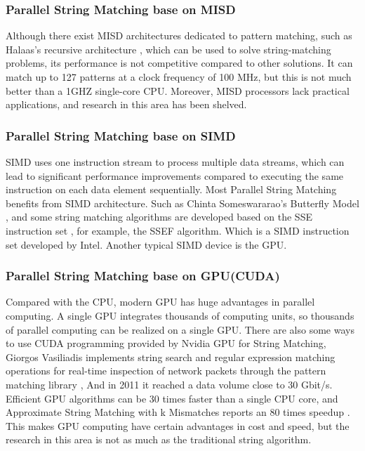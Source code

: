 \documentclass[11pt]{article}       %
\begin{document}
\subsubsection{Parallel String Matching base on MISD}
Although there exist MISD architectures dedicated to pattern matching, such as Halaas's recursive architecture \cite{MISD}, which can be used to solve string-matching problems, its performance is not competitive compared to other solutions. It can match up to 127 patterns at a clock frequency of 100 MHz, but this is not much better than a 1GHZ single-core CPU. Moreover, MISD processors lack practical applications, and research in this area has been shelved.


\subsubsection{Parallel String Matching base on SIMD}
SIMD uses one instruction stream to process multiple data streams, which can lead to significant performance improvements compared to executing the same instruction on each data element sequentially. Most Parallel String Matching benefits from SIMD architecture. Such as Chinta Someswararao's Butterfly Model \cite{Butterfly}, and some string matching algorithms are developed based on the SSE instruction set \cite{Matching}, for example, the SSEF algorithm. Which is a SIMD instruction set developed by Intel. Another typical SIMD device is the GPU.

\subsubsection{Parallel String Matching base on GPU(CUDA)}
Compared with the CPU, modern GPU has huge advantages in parallel computing. A single GPU integrates thousands of computing units, so thousands of parallel computing can be realized on a single GPU. There are also some ways to use CUDA programming provided by Nvidia GPU for String Matching, Giorgos Vasiliadis implements string search and regular expression matching operations for real-time inspection of network packets through the pattern matching library \cite{Bit-Parallel}, And in 2011 it reached a data volume close to 30 Gbit/s. Efficient GPU algorithms can be 30 times faster than a single CPU core, and Approximate String Matching with k Mismatches reports an 80 times speedup \cite{pattern-matching}. This makes GPU computing have certain advantages in cost and speed, but the research in this area is not as much as the traditional string algorithm. 
\end{document}
